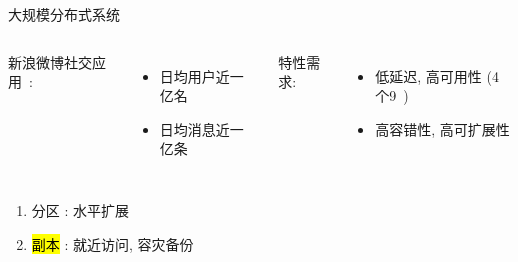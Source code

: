 \begin{frame}{}
  \begin{columns}
    \pause
      \centerline{\hl{}}
  \end{columns}
\end{frame}

\begin{frame}{}
  \centerline{\large 大规模分布式系统}

  \vspace{0.50cm}

  \begin{columns}
    新浪微博社交应用~\footnotemark:
    \begin{itemize}
      \item 日均用户近一亿名
      \item 日均消息近一亿条
    \end{itemize}
    \pause
    特性需求: 
    \begin{itemize}
      \item 低延迟, 高可用性 (4个9~\footnotemark)
      \item 高容错性, 高可扩展性
    \end{itemize}
  \end{columns}
  
\end{frame}
\begin{frame}{}
  \graphicspath{{tikz/}}
  \begin{figure}[h!]
    \centering
    \begin{adjustbox}{max totalsize = {0.50\textwidth}{1.00\textheight}, center}
      
    \end{adjustbox}
  \end{figure}

  \vspace{0.20cm}
  \begin{center}
    \begin{minipage}{0.65\textwidth}

      \vspace{0.20cm}
      \begin{enumerate}
	\item<2-> 分区 : 水平扩展
	\item<3-> \hl{副本 }: 就近访问, 容灾备份
      \end{enumerate}
    \end{minipage}
  \end{center}
\end{frame}

